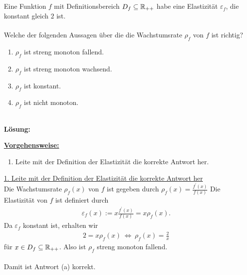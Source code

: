 \subsection*{}
Eine Funktion $ f $ mit Definitionsbereich $ D_f \subseteq \mathbb{R}_{++} $ habe eine Elastizität $ \varepsilon_f $, die konstant gleich $ 2 $ ist.\\
\\
Welche der folgenden Aussagen über die die Wachstumsrate $ \rho_f $ von $ f $ ist richtig?
\renewcommand{\labelenumi}{(\alph{enumi})}
\begin{enumerate}
	\item 
	$ \rho_f $ ist streng monoton fallend.
	\item
	$ \rho_f $ ist streng monoton wachsend.
	\item
	$ \rho_f $ ist konstant.
	\item
	$ \rho_f $ ist nicht monoton.
\end{enumerate}
\ \\
\textbf{Lösung:}
\begin{mdframed}
\underline{\textbf{Vorgehensweise:}}
\renewcommand{\labelenumi}{\theenumi.}
\begin{enumerate}
\item Leite mit der Definition der Elastizität die korrekte Antwort her.
\end{enumerate}
\end{mdframed}

\underline{1. Leite mit der Definition der Elastizität die korrekte Antwort her}\\
Die Wachstumsrate $ \rho_f(x) $ von $ f $ ist gegeben durch $ \rho_f(x) = \frac{f^\prime(x)}{f(x)} $
Die Elastizität von $ f $ ist definiert durch
\begin{align*}
	\varepsilon_f(x) := x \frac{f^\prime(x)}{f(x)} = x \rho_f(x).
\end{align*}
Da $ \varepsilon_f $ konstant ist, erhalten wir
\begin{align*}
	2 = x \rho_f(x)
	\ \Leftrightarrow \ 
	\rho_f(x) = \frac{2}{x}
\end{align*}
für $ x \in D_f \subseteq \mathbb{R}_{++} $.
Also ist $ \rho_f $ streng monoton fallend.\\
\\
Damit ist Antwort (a) korrekt.

\newpage

